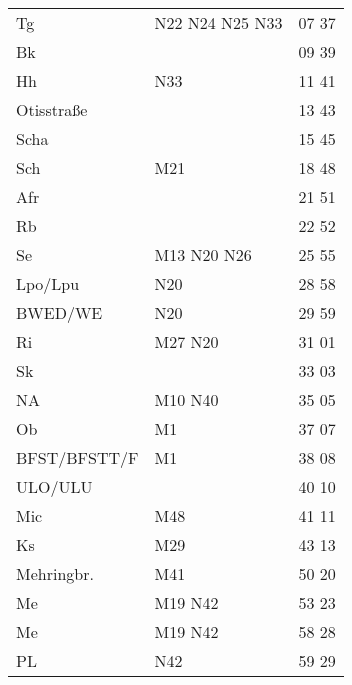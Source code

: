 \begin{tabular}{!{\color{schiefergrau}\vrule width 3pt}*{3}{l!{\color{schiefergrau}\vrule width 3pt}}}
\hline
{}
 \\
\hline
Tg           & \nbus{} N22 N24 N25 N33             & 07 37 \\
Bk           &                                     & 09 39 \\
Hh           & \nbus{} N33                         & 11 41 \\
Otisstraße   &                                     & 13 43 \\
Scha         &                                     & 15 45 \\
Sch          & \mbus{} M21                         & 18 48 \\
Afr          &                                     & 21 51 \\
Rb           &                                     & 22 52 \\
Se           & \mtram{} M13 \nbus{} N20 N26        & 25 55 \\
Lpo/Lpu      & \nuneun{} \nbus{} N20               & 28 58 \\
BWED/WE      & \nbus{} N20                         & 29 59 \\
Ri           & \mbus{} M27 \nbus{} N20             & 31 01 \\
Sk           &                                     & 33 03 \\
NA           & \mtram{} M10 \nbus{} N40            & 35 05 \\
Ob           & \mtram{} M1                         & 37 07 \\
BFST/BFSTT/F & \mtram{} M1                         & 38 08 \\
ULO/ULU      & \nuzwei{}                           & 40 10 \\
Mic          & \mbus{} M48                         & 41 11 \\
Ks           & \mbus{} M29                         & 43 13 \\
Mehringbr.   & \nueins{} \mbus{} M41               & 50 20 \\
Me           & \nusieben{} \mbus{} M19 \nbus{} N42 & 53 23 \\
\hline
Me           & \nusieben{} \mbus{} M19 \nbus{} N42 & 58 28 \\
PL           & \nbus{} N42                         & 59 29 \\

\end{tabular}
